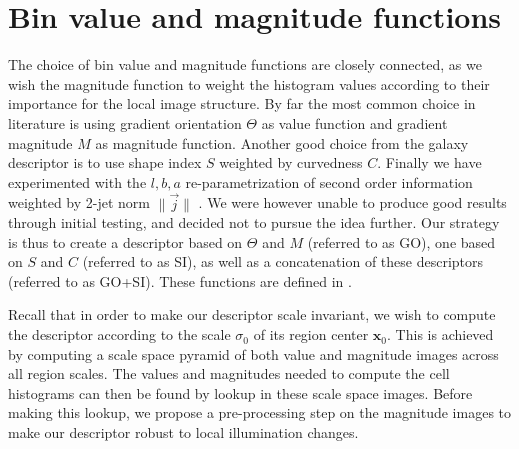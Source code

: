 \documentclass[thesis.tex]{subfiles}
\def\x{\mathbf{x}}
\begin{document}
\section{Bin value and magnitude functions}
\label{sec:valueMagnitudeFunctions}
%
The choice of bin value and magnitude functions are closely connected, as we wish the magnitude function to weight the histogram values according to their importance for the local image structure. By far the most common choice in literature \cite{lowe2004distinctive,ke2004pca,mikolajczyk2005performance,tola2008fast} is using gradient orientation $\Theta$ as value function and gradient magnitude $M$ as magnitude function. Another good choice from the galaxy descriptor \cite{pedersen2013shape} is to use shape index $S$ weighted by curvedness $C$. Finally we have experimented with the $l,b,a$ re-parametrization of second order information weighted by 2-jet norm $\| \overset{\rightarrow}{j} \|$ \citep{griffin2007second}. We were however unable to produce good results through initial testing, and decided not to pursue the idea further. Our strategy is thus to create a descriptor based on $\Theta$ and $M$ (referred to as GO), one based on $S$ and $C$ (referred to as SI), as well as a concatenation of these descriptors (referred to as GO+SI). These functions are defined in .

Recall that in order to make our descriptor scale invariant, we wish to compute the descriptor according to the scale $\sigma_0$ of its region center $\x_0$. This is achieved by computing a scale space pyramid of both value and magnitude images across all region scales. The values and magnitudes needed to compute the cell histograms can then be found by lookup in these scale space images. Before making this lookup, we propose a pre-processing step on the magnitude images to make our descriptor robust to local illumination changes.
%
\end{document}
